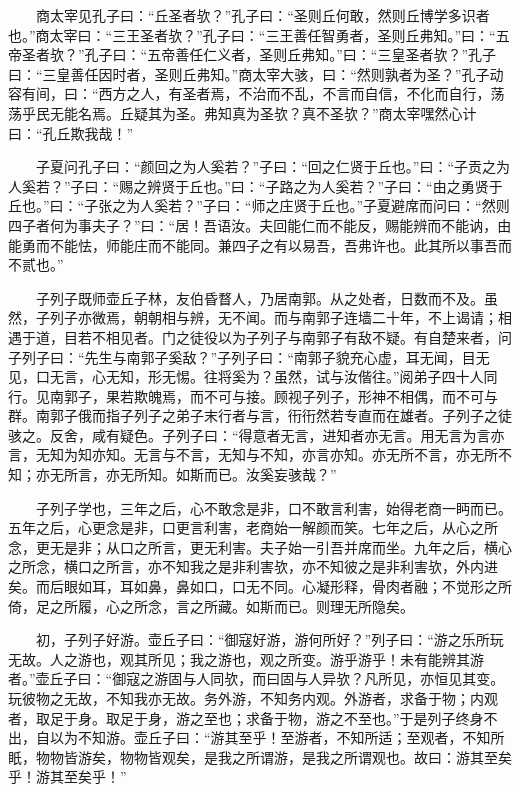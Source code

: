 　　商太宰见孔子曰：``丘圣者欤？''孔子曰：``圣则丘何敢，然则丘博学多识者也。''商太宰曰：``三王圣者欤？''孔子曰：``三王善任智勇者，圣则丘弗知。''曰：``五帝圣者欤？''孔子曰：``五帝善任仁义者，圣则丘弗知。''曰：``三皇圣者欤？''孔子曰：``三皇善任因时者，圣则丘弗知。''商太宰大骇，曰：``然则孰者为圣？''孔子动容有间，曰：``西方之人，有圣者焉，不治而不乱，不言而自信，不化而自行，荡荡乎民无能名焉。丘疑其为圣。弗知真为圣欤？真不圣欤？''商太宰嘿然心计曰：``孔丘欺我哉！''

　　子夏问孔子曰：``颜回之为人奚若？''子曰：``回之仁贤于丘也。''曰：``子贡之为人奚若？''子曰：``赐之辨贤于丘也。''曰：``子路之为人奚若？''子曰：``由之勇贤于丘也。''曰：``子张之为人奚若？''子曰：``师之庄贤于丘也。''子夏避席而问曰：``然则四子者何为事夫子？''曰：``居！吾语汝。夫回能仁而不能反，赐能辨而不能讷，由能勇而不能怯，师能庄而不能同。兼四子之有以易吾，吾弗许也。此其所以事吾而不贰也。''

　　子列子既师壶丘子林，友伯昏瞀人，乃居南郭。从之处者，日数而不及。虽然，子列子亦微焉，朝朝相与辨，无不闻。而与南郭子连墙二十年，不上谒请；相遇于道，目若不相见者。门之徒役以为子列子与南郭子有敌不疑。有自楚来者，问子列子曰：``先生与南郭子奚敌？''子列子曰：``南郭子貌充心虚，耳无闻，目无见，口无言，心无知，形无惕。往将奚为？虽然，试与汝偕往。''阅弟子四十人同行。见南郭子，果若欺魄焉，而不可与接。顾视子列子，形神不相偶，而不可与群。南郭子俄而指子列子之弟子末行者与言，衎衎然若专直而在雄者。子列子之徒骇之。反舍，咸有疑色。子列子曰：``得意者无言，进知者亦无言。用无言为言亦言，无知为知亦知。无言与不言，无知与不知，亦言亦知。亦无所不言，亦无所不知；亦无所言，亦无所知。如斯而已。汝奚妄骇哉？''

　　子列子学也，三年之后，心不敢念是非，口不敢言利害，始得老商一眄而已。五年之后，心更念是非，口更言利害，老商始一解颜而笑。七年之后，从心之所念，更无是非；从口之所言，更无利害。夫子始一引吾并席而坐。九年之后，横心之所念，横口之所言，亦不知我之是非利害欤，亦不知彼之是非利害欤，外内进矣。而后眼如耳，耳如鼻，鼻如口，口无不同。心凝形释，骨肉者融；不觉形之所倚，足之所履，心之所念，言之所藏。如斯而已。则理无所隐矣。

　　初，子列子好游。壶丘子曰：``御寇好游，游何所好？''列子曰：``游之乐所玩无故。人之游也，观其所见；我之游也，观之所变。游乎游乎！未有能辨其游者。''壶丘子曰：``御寇之游固与人同欤，而曰固与人异欤？凡所见，亦恒见其变。玩彼物之无故，不知我亦无故。务外游，不知务内观。外游者，求备于物；内观者，取足于身。取足于身，游之至也；求备于物，游之不至也。''于是列子终身不出，自以为不知游。壶丘子曰：``游其至乎！至游者，不知所适；至观者，不知所眂，物物皆游矣，物物皆观矣，是我之所谓游，是我之所谓观也。故曰：游其至矣乎！游其至矣乎！''

